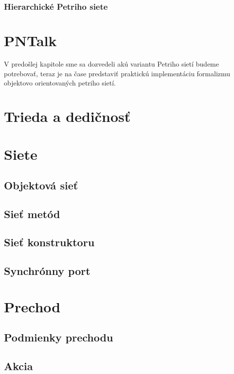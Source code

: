 \subsubsection{Hierarchické Petriho siete}





\section{PNTalk}

V predošlej kapitole sme sa dozvedeli akú variantu Petriho sietí budeme potrebovať, teraz je na čase predstaviť praktickú implementáciu formalizmu objektovo orientovaných petriho sietí.
\section{Trieda a dedičnosť}

\section{Siete}

\subsection{Objektová sieť}

\subsection{Sieť metód}

\subsection{Sieť konstruktoru}

\subsection{Synchrónny port}

\section{Prechod}

\subsection{Podmienky prechodu}

\subsection{Akcia}

